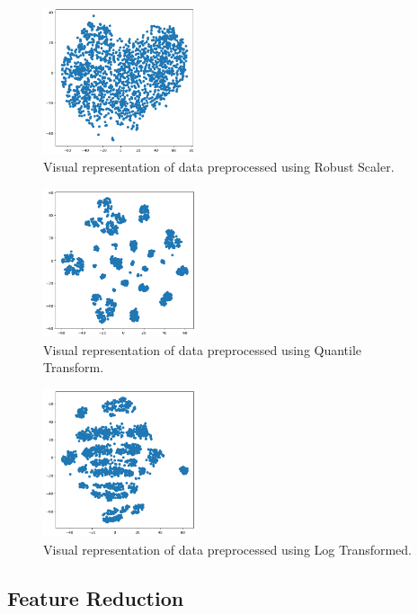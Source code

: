 \documentclass{article}
\begin{document}
\begin{multicols}{2}
\begin{figure}[H]
    \centering
    \includegraphics[width=0.4\textwidth]{images/robust_scaler.png}
    \caption{Visual representation of data preprocessed using Robust Scaler.}
\end{figure}

\begin{figure}[H]
    \centering
    \includegraphics[width=0.4\textwidth]{images/quantile_transform.png}
    \caption{Visual representation of data preprocessed using Quantile Transform.}
\end{figure}

\begin{figure}[H]
    \centering
    \includegraphics[width=0.4\textwidth]{images/log_transformed.png}
    \caption{Visual representation of data preprocessed using Log Transformed.}
\end{figure}

\subsection{Feature Reduction}


\end{multicols}
\end{document}
